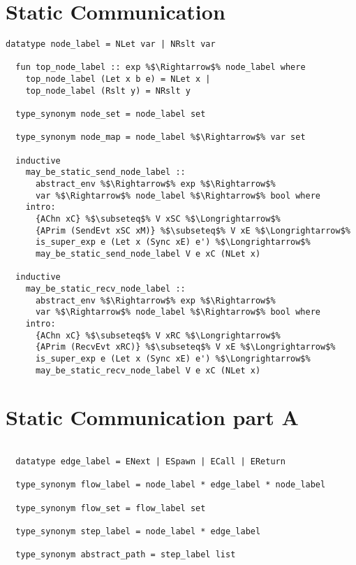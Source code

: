 \documentclass{article}
\begin{document}
\section{Static Communication}
\begin{lstlisting}[style=codestyle1, escapechar=\%]
  datatype node_label = NLet var | NRslt var

  fun top_node_label :: exp %$\Rightarrow$% node_label where
    top_node_label (Let x b e) = NLet x |
    top_node_label (Rslt y) = NRslt y

  type_synonym node_set = node_label set

  type_synonym node_map = node_label %$\Rightarrow$% var set

  inductive
    may_be_static_send_node_label ::
      abstract_env %$\Rightarrow$% exp %$\Rightarrow$%
      var %$\Rightarrow$% node_label %$\Rightarrow$% bool where
    intro:
      {AChn xC} %$\subseteq$% V xSC %$\Longrightarrow$%
      {APrim (SendEvt xSC xM)} %$\subseteq$% V xE %$\Longrightarrow$%
      is_super_exp e (Let x (Sync xE) e') %$\Longrightarrow$%
      may_be_static_send_node_label V e xC (NLet x)

  inductive
    may_be_static_recv_node_label ::
      abstract_env %$\Rightarrow$% exp %$\Rightarrow$%
      var %$\Rightarrow$% node_label %$\Rightarrow$% bool where
    intro:
      {AChn xC} %$\subseteq$% V xRC %$\Longrightarrow$%
      {APrim (RecvEvt xRC)} %$\subseteq$% V xE %$\Longrightarrow$%
      is_super_exp e (Let x (Sync xE) e') %$\Longrightarrow$%
      may_be_static_recv_node_label V e xC (NLet x)

  \end{lstlisting}

\section{Static Communication part A}
\begin{lstlisting}[style=codestyle1, escapechar=\%]

  datatype edge_label = ENext | ESpawn | ECall | EReturn

  type_synonym flow_label = node_label * edge_label * node_label

  type_synonym flow_set = flow_label set

  type_synonym step_label = node_label * edge_label

  type_synonym abstract_path = step_label list
  \end{lstlisting}
\end{document}
